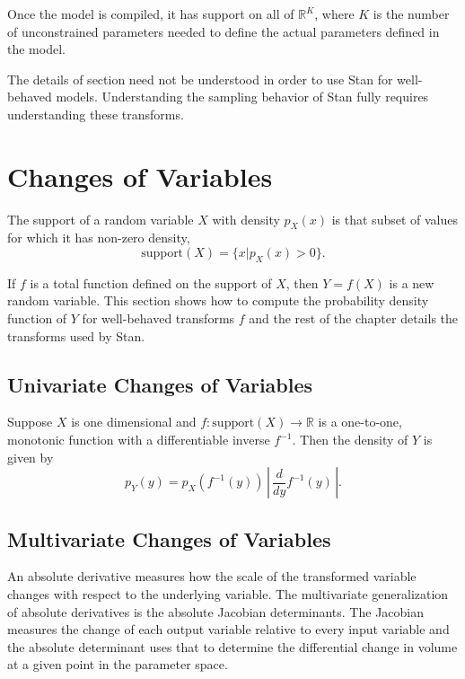 \documentclass[10pt]{report}
\newcommand{\Stan}{Stan\xspace}
\newcommand{\reals}{\mathbb{R}}
\begin{document}
Once the model is compiled, it has support on all of
$\reals^K$, where $K$ is the number of unconstrained parameters
needed to define the actual parameters defined in the model.

The details of section need not be understood in order to use
\Stan for well-behaved models.  Understanding the sampling behavior
of \Stan fully requires understanding these transforms.


\section{Changes of Variables}\label{change-of-variables.section}

The support of a random variable $X$ with density $p_X(x)$ is that
subset of values for which it has non-zero density,
%
\[
\mbox{support}(X) = \{ x | p_X(x) > 0 \}.
\]

If $f$ is a total function defined on the support of $X$, then $Y =
f(X)$ is a new random variable.  This section shows how to compute the
probability density function of $Y$ for well-behaved transforms $f$
and the rest of the chapter details the transforms used by \Stan.



\subsection{Univariate Changes of Variables}

Suppose $X$ is one dimensional and $f: \mbox{support}(X) \rightarrow
\reals$ is a one-to-one, monotonic function with a differentiable
inverse $f^{-1}$.  Then the density of $Y$ is given by
%
\[
p_Y(y) = p_X(f^{-1}(y))  
         \,
         \left| \, \frac{d}{dy} f^{-1}(y)\, \right|.
\]


\subsection{Multivariate Changes of Variables}

An absolute derivative measures how the scale of the transformed
variable changes with respect to the underlying variable.  The
multivariate generalization of absolute derivatives is the absolute
Jacobian determinants.  The Jacobian measures the change of each
output variable relative to every input variable and the absolute
determinant uses that to determine the differential change in volume
at a given point in the parameter space.
\end{document}
